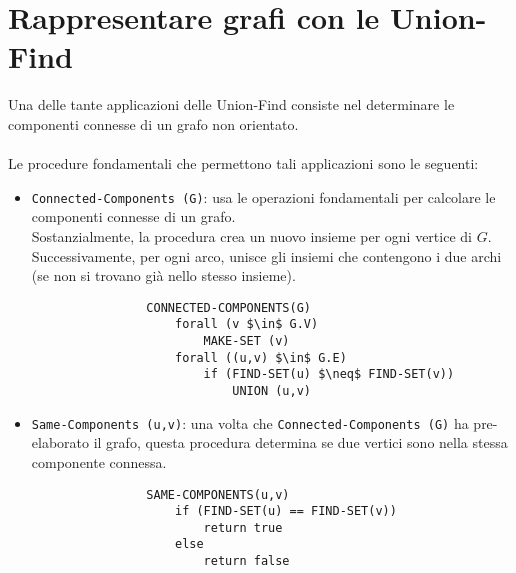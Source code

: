 \section{Rappresentare grafi con le Union-Find}
Una delle tante applicazioni delle Union-Find consiste nel determinare le componenti connesse di un grafo non orientato.\\\\
Le procedure fondamentali che permettono tali applicazioni sono le seguenti:
    \begin{itemize}
        \item{\texttt{Connected-Components (G)}: usa le operazioni fondamentali per calcolare le componenti connesse di un grafo.\\
        Sostanzialmente, la procedura crea un nuovo insieme per ogni vertice di $G$. Successivamente, per ogni arco, unisce gli insiemi che contengono i due archi (se non si trovano già nello stesso insieme).
            \begin{lstlisting}
                CONNECTED-COMPONENTS(G)
                    forall (v $\in$ G.V)
                        MAKE-SET (v)
                    forall ((u,v) $\in$ G.E)
                        if (FIND-SET(u) $\neq$ FIND-SET(v))
                            UNION (u,v)
            \end{lstlisting}}
        \item{\texttt{Same-Components (u,v)}: una volta che \texttt{Connected-Components (G)} ha pre-elaborato il grafo, questa procedura determina se due vertici sono nella stessa componente connessa.
            \begin{lstlisting}
                SAME-COMPONENTS(u,v)
                    if (FIND-SET(u) == FIND-SET(v))
                        return true
                    else
                        return false
            \end{lstlisting}}
    \end{itemize}
    
    
